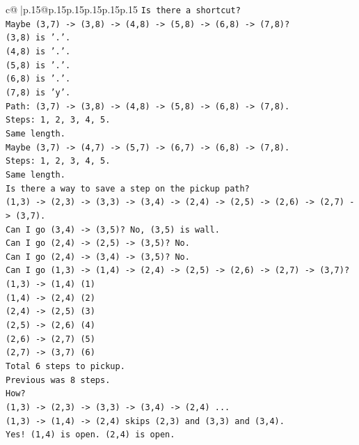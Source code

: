 \documentclass{article}
\begin{document}
{\begin{supertabular}{c@{$\;$}|p{.15\linewidth}@{}p{.15\linewidth}p{.15\linewidth}p{.15\linewidth}p{.15\linewidth}p{.15\linewidth}}
{{{\texttt{Is there a shortcut?} \\
\texttt{Maybe (3,7) {-}> (3,8) {-}> (4,8) {-}> (5,8) {-}> (6,8) {-}> (7,8)?} \\
\texttt{(3,8) is '.'.} \\
\texttt{(4,8) is '.'.} \\
\texttt{(5,8) is '.'.} \\
\texttt{(6,8) is '.'.} \\
\texttt{(7,8) is 'y'.} \\
\texttt{Path: (3,7) {-}> (3,8) {-}> (4,8) {-}> (5,8) {-}> (6,8) {-}> (7,8).} \\
\texttt{Steps: 1, 2, 3, 4, 5.} \\
\texttt{Same length.} \\
\texttt{Maybe (3,7) {-}> (4,7) {-}> (5,7) {-}> (6,7) {-}> (6,8) {-}> (7,8).} \\
\texttt{Steps: 1, 2, 3, 4, 5.} \\
\texttt{Same length.} \\
\texttt{Is there a way to save a step on the pickup path?} \\
\texttt{(1,3) {-}> (2,3) {-}> (3,3) {-}> (3,4) {-}> (2,4) {-}> (2,5) {-}> (2,6) {-}> (2,7) {-}> (3,7).} \\
\texttt{Can I go (3,4) {-}> (3,5)? No, (3,5) is wall.} \\
\texttt{Can I go (2,4) {-}> (2,5) {-}> (3,5)? No.} \\
\texttt{Can I go (2,4) {-}> (3,4) {-}> (3,5)? No.} \\
\texttt{Can I go (1,3) {-}> (1,4) {-}> (2,4) {-}> (2,5) {-}> (2,6) {-}> (2,7) {-}> (3,7)?} \\
\texttt{(1,3) {-}> (1,4) (1)} \\
\texttt{(1,4) {-}> (2,4) (2)} \\
\texttt{(2,4) {-}> (2,5) (3)} \\
\texttt{(2,5) {-}> (2,6) (4)} \\
\texttt{(2,6) {-}> (2,7) (5)} \\
\texttt{(2,7) {-}> (3,7) (6)} \\
\texttt{Total 6 steps to pickup.} \\
\texttt{Previous was 8 steps.} \\
\texttt{How?} \\
\texttt{(1,3) {-}> (2,3) {-}> (3,3) {-}> (3,4) {-}> (2,4) ...} \\
\texttt{(1,3) {-}> (1,4) {-}> (2,4) skips (2,3) and (3,3) and (3,4).} \\
\texttt{Yes! (1,4) is open. (2,4) is open.} \\
}}}
\end{supertabular}}
\end{document}
